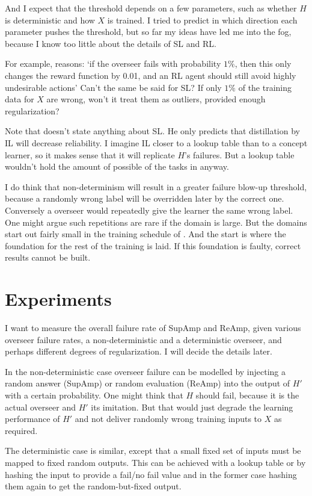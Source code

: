 \documentclass{farlamp}
\begin{document}
And I expect that the threshold depends on a few parameters, such as whether $H$
is deterministic and how $X$ is trained. I tried to predict in which direction
each parameter pushes the threshold, but so far my ideas have led me into the
fog, because I know too little about the details of SL and RL.

For example, \textcite{ChriRelAmp} reasons: ‘if the overseer fails with
probability $1 \%$, then this only changes the reward function by 0.01, and an
RL agent should still avoid highly undesirable actions’ Can't the same be said
for SL? If only $1 \%$ of the training data for $X$ are wrong, won't it treat
them as outliers, provided enough regularization?

Note that \textcite{ChriRelAmp} doesn't state anything about SL. He only
predicts that distillation by IL will decrease reliability. I imagine IL closer
to a lookup table than to a concept learner, so it makes sense that it will
replicate $H$'s failures. But a lookup table wouldn't hold the amount of
possible of the tasks in \textcite{CSASupAmp} anyway.

I do think that non-determinism will result in a greater failure blow-up
threshold, because a randomly wrong label will be overridden later by the
correct one. Conversely a overseer would repeatedly give the learner the same
wrong label. One might argue such repetitions are rare if the domain is large.
But the domains start out fairly small in the training schedule of
\textcite{CSASupAmp}. And the start is where the foundation for the rest of the
training is laid. If this foundation is faulty, correct results cannot be built.


\section{Experiments}

I want to measure the overall failure rate of SupAmp and ReAmp, given various
overseer failure rates, a non-deterministic and a deterministic overseer, and
perhaps different degrees of regularization. I will decide the details later.

In the non-deterministic case overseer failure can be modelled by injecting a
random answer (SupAmp) or random evaluation (ReAmp) into the output of $H'$ with
a certain probability. One might think that $H$ should fail, because it is the
actual overseer and $H'$ its imitation. But that would just degrade the learning
performance of $H'$ and not deliver randomly wrong training inputs to $X$ as
required.

The deterministic case is similar, except that a small fixed set of inputs must
be mapped to fixed random outputs. This can be achieved with a lookup table or
by hashing the input to provide a fail/no fail value and in the former case
hashing them again to get the random-but-fixed output.


\printbibliography
\end{document}
